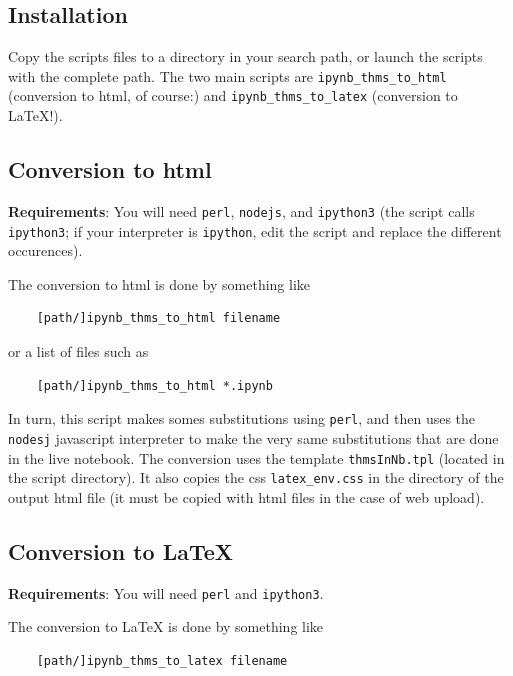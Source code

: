     \subsection{Installation}\label{installation}

    Copy the scripts files to a directory in your search path, or launch the
scripts with the complete path. The two main scripts are
\texttt{ipynb\_thms\_to\_html} (conversion to html, of course:) and
\texttt{ipynb\_thms\_to\_latex} (conversion to LaTeX!).

    \subsection{Conversion to html}\label{conversion-to-html}

    \textbf{Requirements}: You will need \texttt{perl}, \texttt{nodejs}, and
\texttt{ipython3} (the script calls \texttt{ipython3}; if your
interpreter is \texttt{ipython}, edit the script and replace the
different occurences).

The conversion to html is done by something like

\begin{verbatim}
    [path/]ipynb_thms_to_html filename
\end{verbatim}

or a list of files such as

\begin{verbatim}
    [path/]ipynb_thms_to_html *.ipynb
\end{verbatim}

In turn, this script makes somes substitutions using \texttt{perl}, and
then uses the \texttt{nodesj} javascript interpreter to make the very
same substitutions that are done in the live notebook. The conversion
uses the template \texttt{thmsInNb.tpl} (located in the script
directory). It also copies the css \texttt{latex\_env.css} in the
directory of the output html file (it must be copied with html files in
the case of web upload).

    \subsection{Conversion to LaTeX}\label{conversion-to-latex}

    \textbf{Requirements}: You will need \texttt{perl} and
\texttt{ipython3}.

The conversion to LaTeX is done by something like

\begin{verbatim}
    [path/]ipynb_thms_to_latex filename
\end{verbatim}


